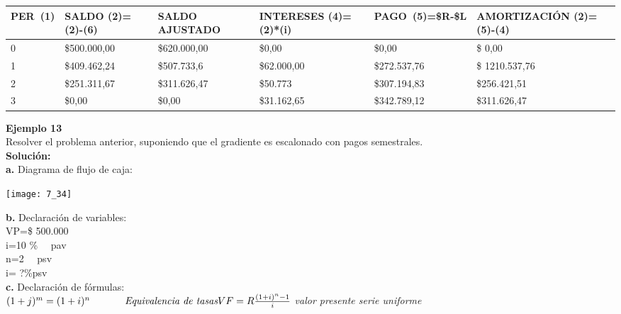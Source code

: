 \begin{spacing}{1.1}
    \begin{center}
        \begin{tabular}{|p{1cm}|p{2cm}|p{3cm}|p{2cm}|p{2cm}||p{3cm}|}
        \hline 
        \rowcolor{white!50}
 \textbf{PER\ (1)}  & \textbf{SALDO (2)=(2)-(6)}& \textbf{SALDO AJUSTADO } & \textbf{INTERESES  (4)=(2)*(i)}& \textbf{PAGO\ (5)=\$R-\$L }& \textbf{AMORTIZACIÓN  (2)=(5)-(4)} \\ \hline                                    

            0 & \$500.000,00 & \$620.000,00 & \$0,00 & \$0,00 & \$ 0,00\\ \hline 
            1 & \$409.462,24  &\$507.733,6  & \$62.000,00  & \$272.537,76 & \$ 1210.537,76 \\ \hline
            2 & \$251.311,67  &\$311.626,47  & \$50.773  & \$307.194,83 &\$256.421,51 \\ \hline
            3 & \$0,00 & \$0,00  & \$31.162,65 & \$342.789,12 & \$311.626,47 \\ \hline      
       

 
\end{tabular}
\end{center}
\end{spacing}



\textbf{Ejemplo 13}\\
Resolver el problema anterior, suponiendo que el gradiente es escalonado con pagos semestrales.\\

\textbf{Solución:}\\
\textbf{a.}	Diagrama de flujo de caja:
\begin{center}
	\texttt{[image: 7\_34]}
\end{center}
\textbf{b.}	Declaración de variables:\\


	VP=\$ 500.000\\
	i=10 \% \ \ pav\\	
	n=2 \ \ psv\\
	i= ?\%psv\\

\textbf{c.}	Declaración de fórmulas:\\


	$(1 +j)^{m}= (1 +i)^{n} \hspace{35pt} \textit{Equivalencia de tasas}\\
	VF=R \frac{(1+i)^{n}-1}{i}$\hspace{35pt} \textit{valor presente serie uniforme}

